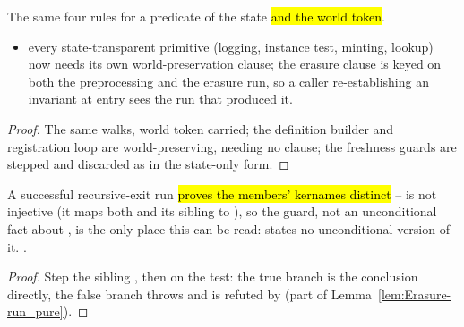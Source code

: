 \begin{proposition}
\label{prop:Erasure-run_nonrec_exit_ok-prime}
\leanok
{}
 The same four rules for a predicate of the state \hl{and the world token}.
\begin{itemize}
\item {} every state-transparent primitive (logging, instance test, minting, lookup) now
needs its own world-preservation clause; the erasure clause is keyed on both the preprocessing and
the erasure run, so a caller re-establishing an invariant at entry sees the run that produced it.
\end{itemize}
\end{proposition}
\begin{proof}
\leanok
{}
 The same walks, world token carried; the definition builder and registration loop are
world-preserving, needing no clause; the freshness guards are stepped and discarded as in the
state-only form.
\end{proof}

\begin{theorem}
\label{thm:Erasure-run_rec_exit_nodup}
\leanok
{}
 A successful recursive-exit run \hl{proves the members' kernames distinct} --
 is not injective (it maps both  and its
 sibling to ), so the guard, not an unconditional fact about
, is the only place this can be read:  states
no unconditional version of it.
 \stProved{}.
\end{theorem}
\begin{proof}
\leanok
{}
 Step the sibling , then  on the  test: the true
branch is the conclusion directly, the false branch throws and is refuted by
 (part of Lemma~\ref{lem:Erasure-run_pure}).
\end{proof}

